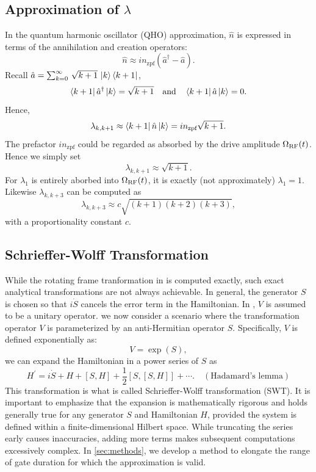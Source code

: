 \subsection{Approximation of $\lambda$}
\label{subsec:lambda}
In the quantum harmonic oscillator (QHO) approximation, $\hat{n}$ is expressed in terms of the annihilation and creation operators:
$$\hat{n} \approx in_{\text{zpf}}(\hat{a}^\dagger - \hat{a}).$$
Recall $\hat{a} = \sum_{k=0}^\infty\,\sqrt{k+1}\,\ket{k}\bra{k+1}$,
$$
  \bra{k+1}\hat{a}^\dagger\ket{k} = \sqrt{k+1}\quad\text{and}\quad
  \bra{k+1}\hat{a}\ket{k} = 0.
$$
Hence,
$$
  \lambda_{k,k+1} \approx \bra{k+1}\hat{n}\ket{k} = in_{\text{zpf}}\sqrt{k+1}.
$$
The prefactor $in_{\text{zpf}}$  could be regarded as absorbed by the drive amplitude $\Omega_{\mathrm{RF}}(t)$.
Hence we simply set
$$
  \lambda_{k,k+1} \approx \sqrt{k+1}.
$$
For $\lambda_1$ is entirely aborbed into $\Omega_{\mathrm{RF}}(t)$, it is exactly (not approximately) $\lambda_1=1$.
Likewise $\lambda_{k,k+3}$ can be computed as \cite{koch2007charge}
$$\lambda_{k,k+3} \approx c \sqrt{(k+1)(k+2)(k+3)},$$
with a proportionality constant $c$.

\subsection{Schrieffer-Wolff Transformation}
\label{subsec:swt}
While the rotating frame tranformation in  is computed exactly,
such exact analytical transformations are not always achievable.
In general, the generator $S$ is chosen so that $i\dot{S}$ cancels the error term in the Hamiltonian.
In , $V$ is assumed to be a unitary operator.
we now consider a scenario where the transformation operator $V$ is parameterized by an  anti-Hermitian operator $S$.
Specifically, $V$ is defined exponentially as:
$$
  V = \exp(S),
$$
we can expand the Hamiltonian in a power series of $S$ as
\begin{equation}
  H^\prime = i\dot{S} + H + [S,H] + \frac{1}{2}[S,[S,H]] + \cdots. \quad(\text{Hadamard's lemma})
  \label{eq:swt}
\end{equation}
This transformation is what is called Schrieffer-Wolff transformation (SWT).
It is important to emphasize that the expansion is mathematically rigorous and holds generally true for any generator
$S$ and Hamiltonian $H$, provided the system is defined within a finite-dimensional Hilbert space.
While truncating the series early causes inaccuracies, adding more terms makes subsequent computations excessively
complex.
In \ref{sec:methods}, we develop a method to
elongate the range of gate duration for which the approximation is valid.


